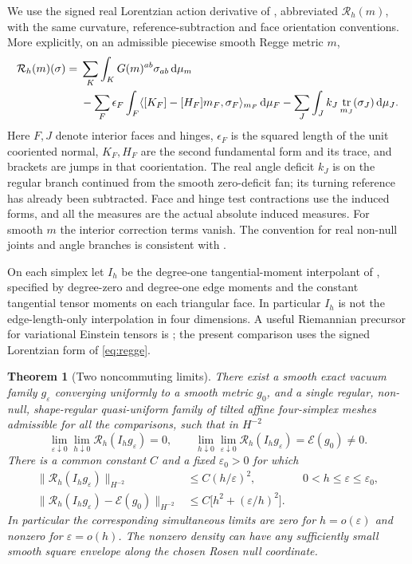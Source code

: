 \documentclass[11pt]{article}
\newtheorem{theorem}{Theorem}
\DeclareMathOperator{\tr}{tr}
\newcommand{\dd}{\mathrm d}
\newcommand{\Rcal}{\mathcal R}
\newcommand{\Ecal}{\mathcal E}
\begin{document}
We use the signed real Lorentzian action derivative of
\cite{SignedRegge}, abbreviated \(\Rcal_h(m)\), with the same
curvature, reference-subtraction and face orientation conventions.
More explicitly, on an admissible piecewise smooth Regge metric \(m\),
\begin{align}
 \Rcal_h(m)(\sigma)
 ={}&\sum_K\int_K G(m)^{ab}\sigma_{ab}\,\dd\mu_m \notag\\
 &-\sum_F \epsilon_F\int_F
      \langle[K_F]-[H_F]m_F,\sigma_F\rangle_{m_F}\,\dd\mu_F
   -\sum_J\int_J k_J\tr_{m_J}(\sigma_J)\,\dd\mu_J .
 \label{eq:regge}
\end{align}
Here \(F,J\) denote interior faces and hinges, \(\epsilon_F\)
is the squared length of the unit cooriented normal, \(K_F,H_F\)
are the second fundamental form and its trace, and brackets are jumps
in that coorientation. The real angle deficit \(k_J\) is on the
regular branch continued from the smooth zero-deficit fan; its
turning reference has already been subtracted. Face and hinge
test contractions use the induced forms, and all the measures
are the actual absolute induced measures. For smooth \(m\) the
interior correction terms vanish. The convention for real
non-null joints and angle branches is consistent with
\cite{Hayward,Sorkin,Asante}.

On each simplex let \(I_h\) be the degree-one tangential-moment
interpolant of \cite{SignedRegge}, specified by degree-zero and
degree-one edge moments and the constant tangential tensor moments
on each triangular face. In particular \(I_h\) is not the
edge-length-only interpolation in four dimensions. A useful
Riemannian precursor for variational Einstein tensors is
\cite{GawlikNeunteufel}; the present comparison uses the signed
Lorentzian form of \eqref{eq:regge}.

\begin{theorem}[Two noncommuting limits]\label{thm:limits}
There exist a smooth exact vacuum family \(g_\varepsilon\) converging
uniformly to a smooth metric \(g_0\), and a single regular, non-null,
shape-regular quasi-uniform family of tilted affine four-simplex
meshes admissible for all the comparisons, such that in \(H^{-2}\)
\begin{equation}
 \lim_{\varepsilon\downarrow0}\lim_{h\downarrow0}
       \Rcal_h(I_hg_\varepsilon)=0,\qquad
 \lim_{h\downarrow0}\lim_{\varepsilon\downarrow0}
       \Rcal_h(I_hg_\varepsilon)=\Ecal(g_0)\ne0 .
 \label{eq:noncommute}
\end{equation}
There is a common constant \(C\) and a fixed
\(\varepsilon_0>0\) for which
\begin{align}
 \|\Rcal_h(I_hg_\varepsilon)\|_{H^{-2}}
   &\le C(h/\varepsilon)^2 ,
               && 0<h\le\varepsilon\le\varepsilon_0,\label{eq:res}\\
 \|\Rcal_h(I_hg_\varepsilon)-\Ecal(g_0)\|_{H^{-2}}
   &\le C\bigl[h^2+(\varepsilon/h)^2\bigr].
               &&\label{eq:under}
\end{align}
In particular the corresponding simultaneous limits are zero
for \(h=o(\varepsilon)\) and nonzero for \(\varepsilon=o(h)\).
The nonzero density can have any sufficiently small smooth
square envelope along the chosen Rosen null coordinate.
\end{theorem}
\end{document}
